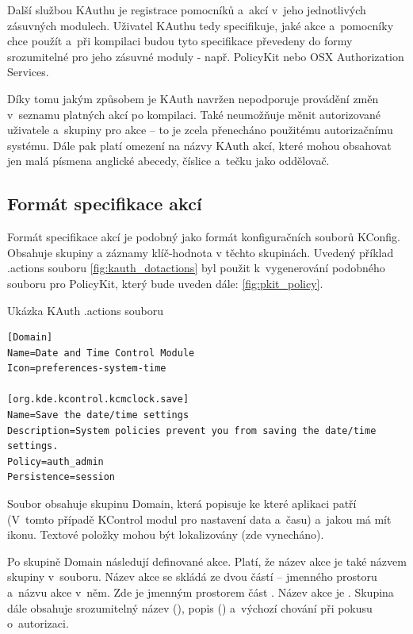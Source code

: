 Další službou KAuthu je registrace pomocníků a~akcí v~jeho jednotlivých zásuvných modulech. Uživatel KAuthu tedy specifikuje, jaké akce a~pomocníky chce použít a~při kompilaci budou tyto specifikace převedeny do formy srozumitelné pro jeho zásuvné moduly - např. PolicyKit nebo OSX Authorization Services.

Díky tomu jakým způsobem je KAuth navržen nepodporuje provádění změn v~seznamu platných akcí po kompilaci. Také neumožňuje měnit autorizované uživatele a~skupiny pro akce -- to je zcela přenecháno použitému autorizačnímu systému. Dále pak platí omezení na názvy KAuth akcí, které mohou obsahovat jen malá písmena anglické abecedy, číslice a~tečku jako oddělovač.

\subsection*{Formát specifikace akcí}
Formát specifikace akcí je podobný jako formát konfiguračních souborů KConfig. Obsahuje skupiny a záznamy klíč-hodnota v těchto skupinách.
Uvedený příklad .actions souboru \ref{fig:kauth_dotactions} byl použit k~vygenerování podobného souboru pro PolicyKit, který bude uveden dále: \ref{fig:pkit_policy}.

\begin{mylisting}
\caption{Ukázka KAuth .actions souboru}
\label{fig:kauth_dotactions}
\begin{lstlisting}
[Domain]
Name=Date and Time Control Module
Icon=preferences-system-time

[org.kde.kcontrol.kcmclock.save]
Name=Save the date/time settings
Description=System policies prevent you from saving the date/time settings.
Policy=auth_admin
Persistence=session
\end{lstlisting}
\end{mylisting}

Soubor obsahuje skupinu Domain, která popisuje ke které aplikaci patří (V~tomto případě KControl modul pro nastavení data a~času) a~jakou má mít ikonu. Textové položky mohou být lokalizovány (zde vynecháno).

Po skupině Domain následují definované akce. Platí, že název akce je také názvem skupiny v~souboru. Název akce se skládá ze dvou částí -- jmenného prostoru a~názvu akce v~něm. Zde je jmenným prostorem část . Název akce je . Skupina dále obsahuje srozumitelný název (), popis () a~výchozí chování při pokusu o~autorizaci.


